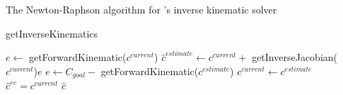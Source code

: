 \begin{table}
  \captionsetup{justification=centering}
  \caption{The Newton-Raphson algorithm for \rimini's inverse kinematic solver}
  \label{tab:newton_raphson_table}
  \begin{algorithm}[H]
  \caption{getInverseKinematics}
  \label{algo:newton_raphson} 
  \DontPrintSemicolon
  $e\gets$ getForwardKinematic($c^{current}$)\;
  {
    $\hat{c}^{estimate} \gets c^{current}+$ getInverseJacobian($c^{current}$)$e$\;\label{ln:newton_raphson_inverse_jacobian}
    $e \gets C_{goal}-$ getForwardKinematic({$c^{estimate}$})\;
    $c^{current} \gets c^{estimate}$\;
  }
    $\hat{c}^{ee}=c^{current}$\;
    \KwRet $\hat{c}$\;

  \end{algorithm}
%
\end{table}
